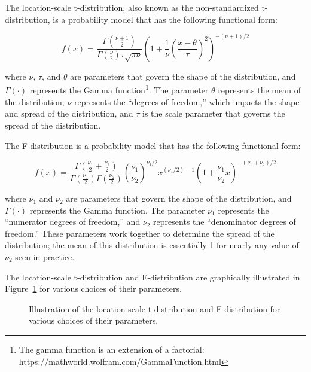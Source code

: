 \documentclass[
  letterpaper,
  DIV=11,
  numbers=noendperiod]{scrreprt}
\theoremstyle{definition}
\theoremstyle{definition}
\theoremstyle{plain}
\theoremstyle{remark}
\begin{document}
The location-scale t-distribution, also known as the non-standardized
t-distribution, is a probability model that has the following functional
form:

\[f(x) = \frac{\Gamma\left(\frac{\nu + 1}{2}\right)}{\Gamma\left(\frac{\nu}{2}\right) \tau \sqrt{\pi \nu}} \left(1 + \frac{1}{\nu}\left(\frac{x - \theta}{\tau}\right)^2\right)^{-(\nu + 1)/2}\]

where \(\nu\), \(\tau\), and \(\theta\) are parameters that govern the
shape of the distribution, and \(\Gamma(\cdot)\) represents the Gamma
function\footnote{The gamma function is an extension of a factorial:
  https://mathworld.wolfram.com/GammaFunction.html}. The parameter
\(\theta\) represents the mean of the distribution; \(\nu\) represents
the ``degrees of freedom,'' which impacts the shape and spread of the
distribution, and \(\tau\) is the scale parameter that governs the
spread of the distribution.

The F-distribution is a probability model that has the following
functional form:

\[f(x) = \frac{\Gamma\left(\frac{\nu_1}{2} + \frac{\nu_2}{2}\right)}{\Gamma\left(\frac{\nu_1}{2}\right)\Gamma\left(\frac{\nu_2}{2}\right)} \left(\frac{\nu_1}{\nu_2}\right)^{\nu_1/2} x^{\left(\nu_1/2\right)-1} \left(1 + \frac{\nu_1}{\nu_2}x\right)^{-\left(\nu_1 + \nu_2\right)/2}\]

where \(\nu_1\) and \(\nu_2\) are parameters that govern the shape of
the distribution, and \(\Gamma(\cdot)\) represents the Gamma function.
The parameter \(\nu_1\) represents the ``numerator degrees of freedom,''
and \(\nu_2\) represents the ``denominator degrees of freedom.'' These
parameters work together to determine the spread of the distribution;
the mean of this distribution is essentially 1 for nearly any value of
\(\nu_2\) seen in practice.

The location-scale t-distribution and F-distribution are graphically
illustrated in Figure~\ref{fig-app-theory-tf} for various choices of
their parameters.

\begin{figure}


\caption{\label{fig-app-theory-tf}Illustration of the location-scale
t-distribution and F-distribution for various choices of their
parameters.}

\end{figure}%
\end{document}
